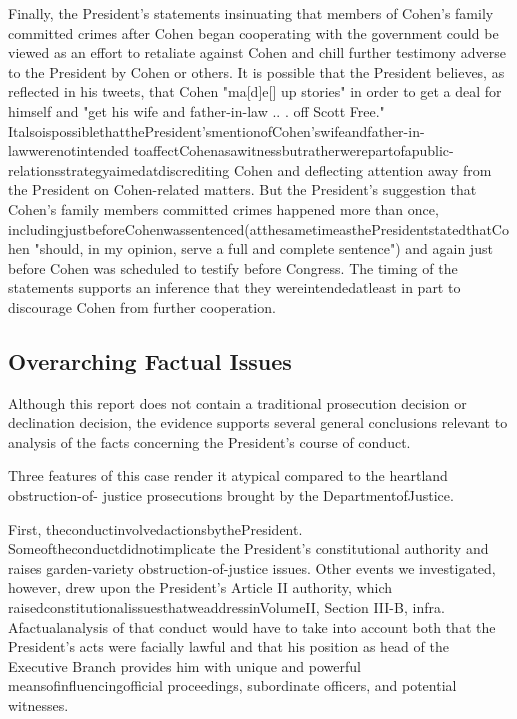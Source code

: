 {Finally, the President's statements insinuating that members of Cohen's family committed crimes after Cohen began cooperating with the government could be viewed as an effort to retaliate against Cohen and chill further testimony adverse to the President by Cohen or others.
It is possible that the President believes, as reflected in his tweets, that Cohen "ma[d]e[] up stories" in order to get a deal for himself and "get his wife and father-in-law .. . off Scott Free." ItalsoispossiblethatthePresident'smentionofCohen'swifeandfather-in-lawwerenotintended toaffectCohenasawitnessbutratherwerepartofapublic-relationsstrategyaimedatdiscrediting Cohen and deflecting attention away from the President on Cohen-related matters.
But the President's suggestion that Cohen's family members committed crimes happened more than once, includingjustbeforeCohenwassentenced(atthesametimeasthePresidentstatedthatCohen "should, in my opinion, serve a full and complete sentence") and again just before Cohen was scheduled to testify before Congress.
The timing of the statements supports an inference that they wereintendedatleast in part to discourage Cohen from further cooperation.

\subsection{Overarching Factual Issues}

Although this report does not contain a traditional prosecution decision or declination decision, the evidence supports several general conclusions relevant to analysis of the facts concerning the President's course of conduct.

Three features of this case render it atypical compared to the heartland obstruction-of- justice prosecutions brought by the DepartmentofJustice.

First, theconductinvolvedactionsbythePresident.
Someoftheconductdidnotimplicate the President's constitutional authority and raises garden-variety obstruction-of-justice issues.
Other events we investigated, however, drew upon the President's Article II authority, which raisedconstitutionalissuesthatweaddressinVolumeII, Section III-B, infra.
Afactualanalysis of that conduct would have to take into account both that the President's acts were facially lawful and that his position as head of the Executive Branch provides him with unique and powerful meansofinfluencingofficial proceedings, subordinate officers, and potential witnesses.

}
